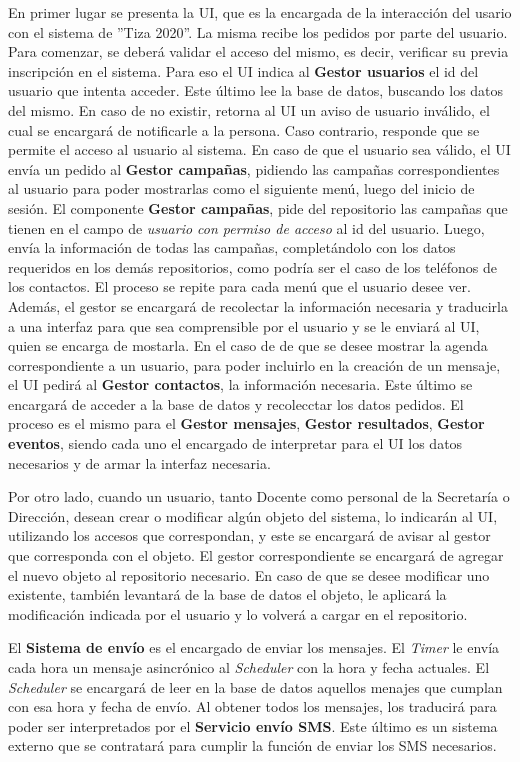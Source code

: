 \documentclass[a4paper, 11pt]{article}
\begin{document}
En primer lugar se presenta la UI, que es la encargada de la interacción del usario con el sistema de ''Tiza 2020''. La misma recibe los pedidos por parte del usuario. Para comenzar, se deberá validar el acceso del mismo, es decir, verificar su previa inscripción en el sistema. Para eso el UI indica al \textbf{Gestor usuarios} el id del usuario que intenta acceder. Este último lee la base de datos, buscando los datos del mismo. En caso de no existir, retorna al UI un aviso de usuario inválido, el cual se encargará de notificarle a la persona. Caso contrario, responde que se permite el acceso al usuario al sistema. 
En caso de que el usuario sea válido, el UI envía un pedido al \textbf{Gestor campañas}, pidiendo las campañas correspondientes al usuario para poder mostrarlas como el siguiente menú, luego del inicio de sesión. El componente \textbf{Gestor campañas}, pide del repositorio las campañas que tienen en el campo de \emph{usuario con permiso de acceso} al id del usuario. Luego, envía la información de todas las campañas, completándolo con los datos requeridos en los demás repositorios, como podría ser el caso de los teléfonos de los contactos. 
El proceso se repite para cada menú que el usuario desee ver. Además, el gestor se encargará de recolectar la información necesaria y traducirla a una interfaz para que sea comprensible por el usuario y se le enviará al UI, quien se encarga de mostarla. En el caso de de que se desee mostrar la agenda correspondiente a un usuario, para poder incluirlo en la creación de un mensaje, el UI pedirá al \textbf{Gestor contactos}, la información necesaria. Este último se encargará de acceder a la base de datos y recolecctar los datos pedidos. El proceso es el mismo para el \textbf{Gestor mensajes}, \textbf{Gestor resultados}, \textbf{Gestor eventos}, siendo cada uno el encargado de interpretar para el UI los datos necesarios y de armar la interfaz necesaria. 

Por otro lado, cuando un usuario, tanto Docente como personal de la Secretaría o Dirección, desean crear o modificar algún objeto del sistema, lo indicarán al UI, utilizando los accesos que correspondan, y este se encargará de avisar al gestor que corresponda con el objeto. El gestor correspondiente se encargará de agregar el nuevo objeto al repositorio necesario.  En caso de que se desee modificar uno existente, también levantará de la base de datos el objeto, le aplicará la modificación indicada por el usuario y lo volverá a cargar en el repositorio. 

El \textbf{Sistema de envío} es el encargado de enviar los mensajes. El \emph{Timer} le envía cada hora un mensaje asincrónico al \emph{Scheduler} con la hora y fecha actuales. El \emph{Scheduler} se encargará de leer en la base de datos aquellos menajes que cumplan con esa hora y fecha de envío. Al obtener todos los mensajes, los traducirá para poder ser interpretados por el \textbf{Servicio envío SMS}. Este último es un sistema externo que se contratará para cumplir la función de enviar los SMS necesarios. 
\end{document}
